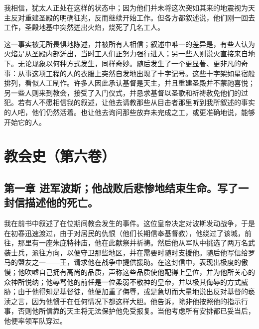 我相信，犹太人正处在这样的状态中；因为他们并未将这次突如其来的地震视为天主反对重建圣殿的明确征兆，反而继续开始工作。但各方都叙述说，他们刚一回去工作，圣殿地基中突然迸出火焰，烧死了几名工人。\par

这一事实被无所畏惧地陈述，并被所有人相信；叙述中唯一的差异是，有些人认为火焰是从圣殿内部迸出，当时工人们正努力强行进入；另一些人则说火直接来自地下。无论现象以何种方式发生，同样奇妙。随后发生了一个更显著、更非凡的奇事：从事这项工程的人的衣服上突然自发地出现了十字记号。这些十字架如星宿般排列，看似人工制作。许多人因此承认基督是天主，并且重建圣殿并不蒙祂喜悦；另一些人则来到教会，接受了入门仪式，并恳求基督以圣歌和祈祷赦免他们的过犯。若有人不愿相信我的叙述，让他去请教那些从目击者那里听到我所叙述的事实的人吧，他们仍然活着。也让他去询问那些放弃未完成之工，或更准确地说，能够开始它的人。\par



\section{教会史（第六卷）}


\subsection{第一章 进军波斯；他战败后悲惨地结束生命。写了一封信描述他的死亡。}

我在前书中叙述了在位期间教会发生的事件。这位皇帝决定对波斯发动战争，于是在初春迅速渡过，由于对居民的仇恨（他们长期信奉基督教），他绕过了该城，前往，那里有一座朱庇特神庙，他在此献祭并祈祷。然后他从军队中挑选了两万名武装士兵，派往方向，以便守卫那些地区，并在需要时随时支援他。随后他写信给罗马的盟友之一——王，请求他在战争中提供援助。在这封信中，表现出极度的傲慢；他吹嘘自己拥有高尚的品质，声称这些品质使他配得上皇位，并为他所关心的众神所悦纳；他辱骂他的前任是一位柔弱不敬神的皇帝，并以极其侮辱的方式威胁；由于他得知是基督徒，他便加重了侮辱，或是急切而大量地说出反对基督的亵渎之言，因为他惯于在任何情况下都这样大胆。他告诉，除非他按照他的指示行事，否则他所信靠的天主将无法保护他免受报复。当他考虑所有安排都已妥当后，他便率领军队穿过。\par

